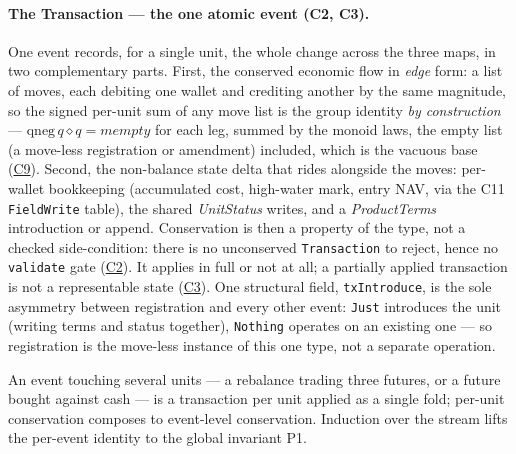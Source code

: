 \documentclass[11pt,a4paper]{article}
\begin{document}
\paragraph{The Transaction --- the one atomic event (C2, C3).}
One event records, for a single unit, the whole change across the three maps, in two
complementary parts. First, the conserved economic flow in \emph{edge} form: a list of
moves, each debiting one wallet and crediting another by the same magnitude, so the signed
per-unit sum of any move list is the group identity \emph{by construction} ---
$\mathrm{qneg}\,q \mathrel{\diamond} q = \mathit{mempty}$ for each leg, summed by the monoid
laws, the empty list (a move-less registration or amendment) included, which is the vacuous
base (\hyperref[cond:C9]{C9}). Second, the non-balance state delta that rides alongside the
moves: per-wallet bookkeeping (accumulated cost, high-water mark, entry NAV, via the C11
\texttt{FieldWrite} table), the shared \emph{UnitStatus} writes, and a \emph{ProductTerms}
introduction or append. Conservation is then a property of the type, not a checked
side-condition: there is no unconserved \texttt{Transaction} to reject, hence no
\texttt{validate} gate (\hyperref[cond:C2]{C2}). It applies in full or not at all; a
partially applied transaction is not a representable state (\hyperref[cond:C3]{C3}). One
structural field, \texttt{txIntroduce}, is the sole asymmetry between registration and every
other event: \texttt{Just} introduces the unit (writing terms and status together),
\texttt{Nothing} operates on an existing one --- so registration is the move-less instance of
this one type, not a separate operation.

An event touching several units --- a rebalance
trading three futures, or a future bought against cash --- is a transaction per unit applied
as a single fold; per-unit conservation composes to event-level conservation. Induction over
the stream lifts the per-event identity to the global invariant P1.
\end{document}
